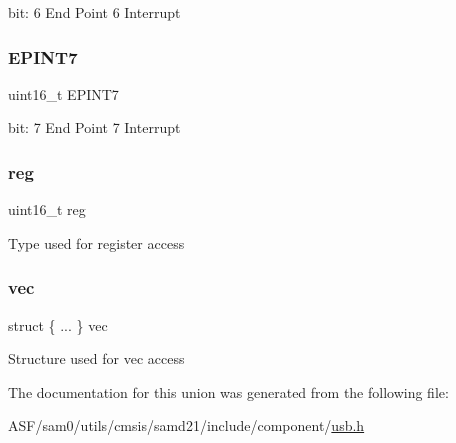 bit\+: 6 End Point 6 Interrupt \mbox{\label{union_u_s_b___d_e_v_i_c_e___e_p_i_n_t_s_m_r_y___type_acb2f7ac05b43be1a27ebe8e216356625}} 
\subsubsection{\texorpdfstring{EPINT7}{EPINT7}}
{\footnotesize\ttfamily uint16\+\_\+t E\+P\+I\+N\+T7}

bit\+: 7 End Point 7 Interrupt \mbox{\label{union_u_s_b___d_e_v_i_c_e___e_p_i_n_t_s_m_r_y___type_a11760f5020019f4aa8cb02e694f7cc44}} 
\subsubsection{\texorpdfstring{reg}{reg}}
{\footnotesize\ttfamily uint16\+\_\+t reg}

Type used for register access \mbox{\label{union_u_s_b___d_e_v_i_c_e___e_p_i_n_t_s_m_r_y___type_a9be605b3aed3d7e1cad4319e5f3409b6}} 
\subsubsection{\texorpdfstring{vec}{vec}}
{\footnotesize\ttfamily struct \{ ... \}   vec}

Structure used for vec access 

The documentation for this union was generated from the following file\+:\begin{DoxyCompactItemize}
\item 
A\+S\+F/sam0/utils/cmsis/samd21/include/component/\mbox{\hyperlink{component_2usb_8h}{usb.\+h}}\end{DoxyCompactItemize}

